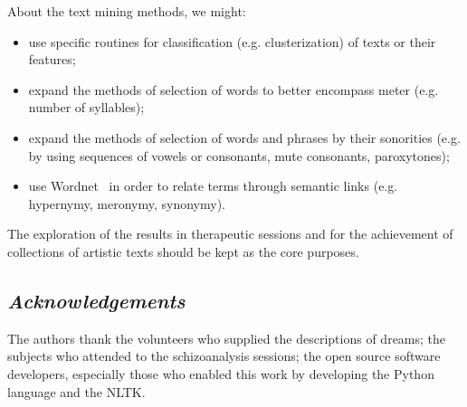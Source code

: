 \documentclass[12pt,fleqn]{article}
\begin{document}
\noindent About the text mining methods, we might:
\begin{itemize}
	\item use specific routines for classification (e.g. clusterization) of texts or their features;
	\item expand the methods of selection of words to better encompass meter (e.g. number of syllables);
	\item expand the methods of selection of words and phrases by their sonorities (e.g. by using sequences of vowels or consonants, mute consonants, paroxytones);
	\item use Wordnet~\citep{wordnet} in order to relate terms through semantic links (e.g. hypernymy, meronymy, synonymy).
\end{itemize}

The exploration of the results in therapeutic sessions and for the achievement of collections of
artistic texts should be kept as the core purposes.

\subsection*{\textit{Acknowledgements}}
The authors thank the volunteers who supplied the descriptions of dreams;
the subjects who attended to the schizoanalysis sessions;
the open source software developers, especially those who enabled this work by developing
the Python language and the NLTK.
\end{document}

